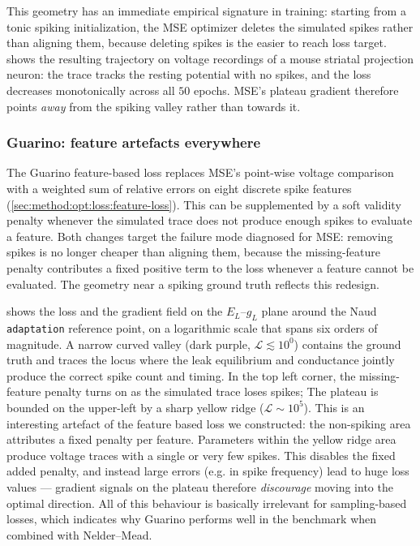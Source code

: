 This geometry has an immediate empirical signature in training: starting from a tonic spiking initialization, the \gls{MSE} optimizer deletes the simulated spikes rather than aligning them, because deleting spikes is the easier to reach loss target.
 shows the resulting trajectory on voltage recordings of a mouse striatal projection neuron:
the trace tracks the resting potential with no spikes, and the loss decreases monotonically across all $50$ epochs.
\gls{MSE}'s plateau gradient therefore points \emph{away} from the spiking valley rather than towards it.

\subsubsection{Guarino: feature artefacts everywhere}\label{sec:results:landscape:guarino}

The Guarino feature-based loss replaces \gls{MSE}'s point-wise voltage comparison with a weighted sum of relative errors on eight discrete spike features (\cref{sec:method:opt:loss:feature-loss}).
This can be supplemented by a soft validity penalty whenever the simulated trace does not produce enough spikes to evaluate a feature.
Both changes target the failure mode diagnosed for \gls{MSE}: removing spikes is no longer cheaper than aligning them, because the missing-feature penalty contributes a fixed positive term to the loss whenever a feature cannot be evaluated.
The geometry near a spiking ground truth reflects this redesign.

 shows the loss and the gradient field on the $E_L$--$g_L$ plane around the Naud \texttt{adaptation} reference point, on a logarithmic scale that spans six orders of magnitude.
A narrow curved valley (dark purple, $\mathcal{L} \lesssim 10^{0}$) contains the ground truth and traces the locus where the leak equilibrium and conductance jointly produce the correct spike count and timing.
In the top left corner, the missing-feature penalty turns on as the simulated trace loses spikes;
The plateau is bounded on the upper-left by a sharp yellow ridge ($\mathcal{L}\sim 10^{5}$).
This is an interesting artefact of the feature based loss we constructed: the non-spiking area attributes a fixed penalty per feature.
Parameters within the yellow ridge area produce voltage traces with a single or very few spikes.
This disables the fixed added penalty, and instead large errors (e.g. in spike frequency) lead to huge loss values --- gradient signals on the plateau therefore \emph{discourage} moving into the optimal direction.
All of this behaviour is basically irrelevant for sampling-based losses, which indicates why Guarino performs well in the benchmark when combined with Nelder--Mead.

